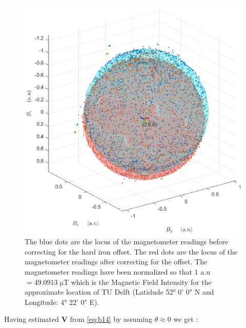 \begin{figure}[ht]
    \centering
    \includegraphics[scale=0.5]{images/magnet_sphere.eps}
    \caption{The blue dots are the locus of the magnetometer readings before correcting for the hard iron offset. The red dots are the locus of the magnetometer readings after correcting for the offset. The magnetometer readings have been normalized so that 1 a.u\ensuremath{=49.0913\; \si{\micro\tesla}} which is the Magnetic Field Intensity for the approximate location of TU Delft (Latidude  52\si{\degree} 0' 0" N and Longitude: 4\si{\degree} 22' 0" E).}
        \label{fig:sphere_mag}
\end{figure}

Having estimated \ensuremath{\boldsymbol{V}} from \cref{eq:b14} by assuming \ensuremath{\theta\approx0} we get :



